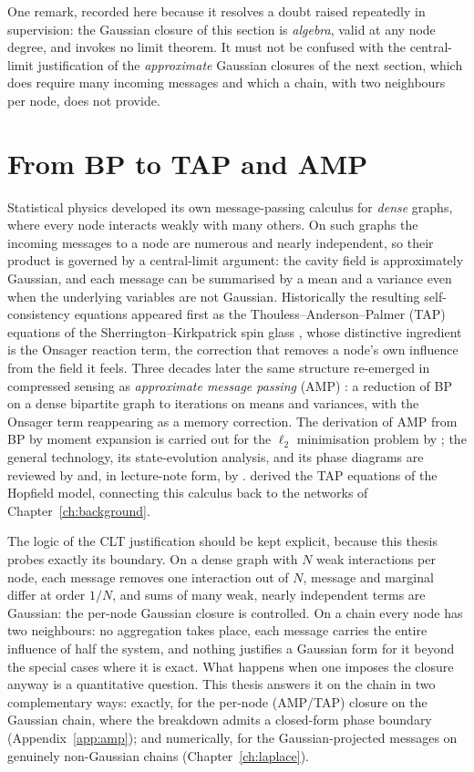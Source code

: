 One remark, recorded here because it resolves a doubt raised repeatedly
in supervision: the Gaussian closure of this section is \emph{algebra},
valid at any node degree, and invokes no limit theorem. It must not be
confused with the central-limit justification of the \emph{approximate}
Gaussian closures of the next section, which does require many incoming
messages and which a chain, with two neighbours per node, does not
provide.

\section{From BP to TAP and AMP}\label{sec:amp-intro}

Statistical physics developed its own message-passing calculus for
\emph{dense} graphs, where every node interacts weakly with many others.
On such graphs the incoming messages to a node are numerous and nearly
independent, so their product is governed by a central-limit argument:
the cavity field is approximately Gaussian, and each message can be
summarised by a mean and a variance even when the underlying variables
are not Gaussian. Historically the resulting self-consistency equations
appeared first as the Thouless--Anderson--Palmer (TAP) equations of the
Sherrington--Kirkpatrick spin glass \citep{thouless1977solution}, whose
distinctive ingredient is the Onsager reaction term, the correction that
removes a node's own influence from the field it feels. Three decades
later the same structure re-emerged in compressed sensing as
\emph{approximate message passing} (AMP) \citep{donoho2009message}: a
reduction of BP on a dense bipartite graph to iterations on means and
variances, with the Onsager term reappearing as a memory correction. The
derivation of AMP from BP by moment expansion is carried out for the
$\ell_2$ minimisation problem by \citet{genovese2026amp}; the general
technology, its state-evolution analysis, and its phase diagrams are
reviewed by \citet{zdeborova2016statistical} and, in lecture-note form,
by \citet{krzakala2024statphys}. \citet{mezard2017meanfield} derived the
TAP equations of the Hopfield model, connecting this calculus back to the
networks of Chapter~\ref{ch:background}.

The logic of the CLT justification should be kept explicit, because this
thesis probes exactly its boundary. On a dense graph with $N$ weak
interactions per node, each message removes one interaction out of $N$,
message and marginal differ at order $1/N$, and sums of many weak,
nearly independent terms are Gaussian: the per-node Gaussian closure is
controlled. On a chain every node has two neighbours: no aggregation
takes place, each message carries the entire influence of half the
system, and nothing justifies a Gaussian form for it beyond the special
cases where it is exact. What happens when one imposes the closure
anyway is a quantitative question. This thesis answers it on the chain
in two complementary ways: exactly, for the per-node (AMP/TAP) closure
on the Gaussian chain, where the breakdown admits a closed-form phase
boundary (Appendix~\ref{app:amp}); and numerically, for the
Gaussian-projected messages on genuinely non-Gaussian chains
(Chapter~\ref{ch:laplace}).

